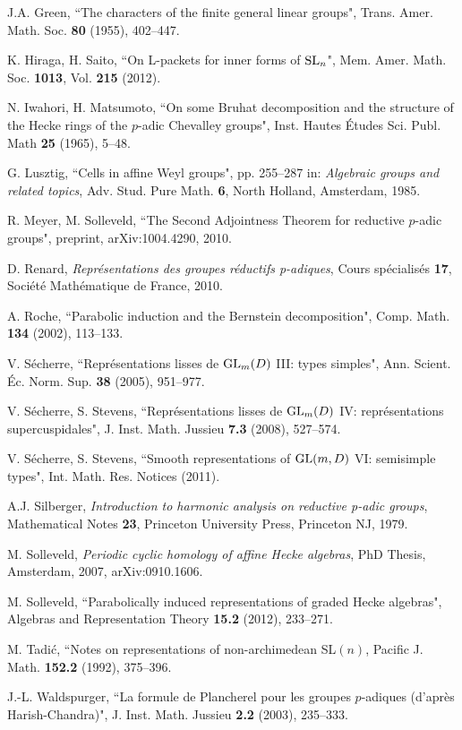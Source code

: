 \documentclass[11pt]{amsart}
\theoremstyle{definition}
\begin{document}
\begin{thebibliography}{99}
 J.A. Green, ``The characters of the finite general linear groups",
Trans. Amer. Math. Soc. {\bf 80} (1955), 402--447.

 K. Hiraga, H. Saito, ``On L-packets for inner forms of ${{\rm SL}}_n$",
Mem. Amer. Math. Soc. {\bf 1013}, Vol. {\bf 215} (2012).

 N. Iwahori, H. Matsumoto,
``On some Bruhat decomposition and the structure
of the Hecke rings of the $p$-adic Chevalley groups",
Inst. Hautes \'Etudes Sci. Publ. Math {\bf 25} (1965), 5--48.

 G. Lusztig, ``Cells in affine Weyl groups",
pp. 255--287 in: \emph{Algebraic groups and related topics},
Adv. Stud. Pure Math. {\bf 6}, North Holland, Amsterdam, 1985.

 R. Meyer, M. Solleveld, ``The Second Adjointness Theorem for 
reductive $p$-adic groups", preprint, arXiv:1004.4290, 2010.

 D. Renard, 
\emph{Repr\'esentations des groupes r\'eductifs p-adiques},
Cours sp\'ecialis\'es {\bf 17}, Soci\'et\'e Math\'ematique de France, 2010.

 A. Roche, ``Parabolic induction and the Bernstein decomposition",
Comp. Math. {\bf 134} (2002), 113--133.

 V. S\'echerre, 
``Repr\'esentations lisses de ${{\rm GL}}_m (D)$ III: types simples",
Ann. Scient. \'Ec. Norm. Sup. {\bf 38} (2005), 951--977.

 V. S\'echerre, S. Stevens, 
``Repr\'esentations lisses de ${{\rm GL}}_m (D)$ IV: repr\'esentations supercuspidales", 
J. Inst. Math. Jussieu {\bf 7.3} (2008), 527--574.

 V. S\'echerre, S. Stevens,
``Smooth representations of ${{\rm GL}}(m,D)$ VI: semisimple types",
Int. Math. Res. Notices (2011).

 A.J. Silberger, 
\emph{Introduction to harmonic analysis on reductive p-adic groups}, 
Mathematical Notes {\bf 23}, Princeton University Press, Princeton NJ, 1979.

 M. Solleveld, 
\emph{Periodic cyclic homology of affine Hecke algebras},
PhD Thesis, Amsterdam, 2007, arXiv:0910.1606.

 M. Solleveld,
``Parabolically induced representations of graded Hecke algebras",
Algebras and Representation Theory \textbf{15.2} (2012), 233--271.

 M. Tadi\'c, ``Notes on representations of non-archimedean SL$(n)$,
Pacific J. Math. \textbf{152.2} (1992), 375--396.

 J.-L. Waldspurger, 
``La formule de Plancherel pour les groupes $p$-adiques (d'apr\`es Harish-Chandra)", 
J. Inst. Math. Jussieu {\bf 2.2} (2003), 235--333.

\end{thebibliography}
\end{document}
